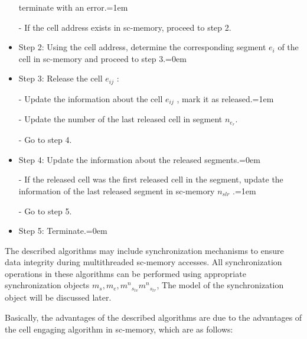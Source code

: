 \documentclass{scndocument}
\begin{document}
\begin{SCn}
\begin{multicols}{2}
\begin{itemize}
terminate with an error.\leftskip=1em
\item[-] If the cell address exists in sc-memory, proceed
to step 2.
\item  Step 2: Using the cell address, determine the corresponding segment $e_i$ of the cell in sc-memory and proceed to step 3.\leftskip=0em
\item Step 3: Release the cell $e_{ij}$ :
\item[-] Update the information about the cell $e_{ij}$  , mark
it as released.\leftskip=1em
\item[-] Update the number of the last released cell in
segment $n_{e_r}$.
\item[-] Go to step 4.
\item Step 4: Update the information about the released
segments.\leftskip=0em
\item[-] If the released cell was the first released cell in
the segment, update the information of the last released segment in sc-memory $n_{slr}$ .\leftskip=1em
\item[-] Go to step 5.
\item Step 5: Terminate.\leftskip=0em
\end{itemize}

The described algorithms may include synchronization mechanisms to ensure data integrity during multithreaded sc-memory accesses. All synchronization operations in these algorithms can be performed using appropriate synchronization objects $m_s ,  m_e,  m^n {_{s_l{}_v}} m^n {_{s_l{}_r}}$,  The model of the synchronization object will be discussed later. \par
 Basically, the advantages of the described algorithms
are due to the advantages of the cell engaging algorithm
in sc-memory, which are as follows:


\end{multicols}
\end{SCn}
\end{document}
